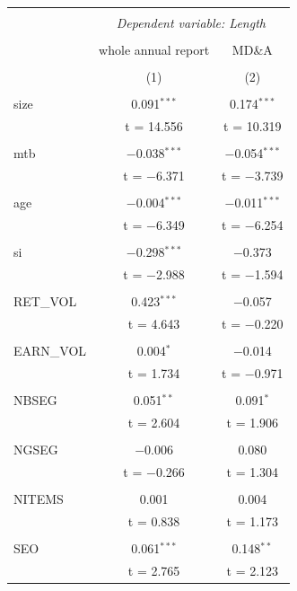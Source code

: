 \documentclass[a4paper]{article}
\begin{document}
\begin{center}
\begin{longtable}{@{\extracolsep{5pt}}lcc}
\\[-1.8ex]\hline 
\hline \\[-1.8ex] 
 & \multicolumn{2}{c}{\textit{Dependent variable: Length}} \\ 
\cline{2-3} 
\\[-1.8ex] &whole annual report&MD\&A \\ 
\\[-1.8ex] & (1) & (2)\\ 
\hline \\[-1.8ex] 
 size & 0.091$^{***}$ & 0.174$^{***}$ \\ 
  & t = 14.556 & t = 10.319 \\ 
  & & \\ 
 mtb & $-$0.038$^{***}$ & $-$0.054$^{***}$ \\ 
  & t = $-$6.371 & t = $-$3.739 \\ 
  & & \\ 
 age & $-$0.004$^{***}$ & $-$0.011$^{***}$ \\ 
  & t = $-$6.349 & t = $-$6.254 \\ 
  & & \\ 
 si & $-$0.298$^{***}$ & $-$0.373 \\ 
  & t = $-$2.988 & t = $-$1.594 \\ 
  & & \\ 
 RET\_VOL & 0.423$^{***}$ & $-$0.057 \\ 
  & t = 4.643 & t = $-$0.220 \\ 
  & & \\ 
 EARN\_VOL & 0.004$^{*}$ & $-$0.014 \\ 
  & t = 1.734 & t = $-$0.971 \\ 
  & & \\ 
 NBSEG & 0.051$^{**}$ & 0.091$^{*}$ \\ 
  & t = 2.604 & t = 1.906 \\ 
  & & \\ 
 NGSEG & $-$0.006 & 0.080 \\ 
  & t = $-$0.266 & t = 1.304 \\ 
  & & \\ 
 NITEMS & 0.001 & 0.004 \\ 
  & t = 0.838 & t = 1.173 \\ 
  & & \\ 
 SEO & 0.061$^{***}$ & 0.148$^{**}$ \\ 
  & t = 2.765 & t = 2.123 \\ 

\end{longtable}
\end{center}
\end{document}
